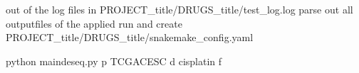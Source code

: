 \documentclass[letterpaper,10pt,english]{sphinxmanual}
\begin{document}
\begin{fulllineitems}
\begin{quote}
\begin{description}
\end{description}\end{quote}

\sphinxAtStartPar
out of the log files in PROJECT\_title/DRUGS\_title/test\_log.log
parse out all outputfiles of the applied run and create
PROJECT\_title/DRUGS\_title/snakemake\_config.yaml

\begin{sphinxVerbatim}[commandchars=\\\{\}]
\PYGZdl{} python main\PYGZus{}deseq.py \PYGZhy{}p TCGA\PYGZhy{}CESC \PYGZhy{}d cisplatin \PYGZhy{}f 
\end{sphinxVerbatim}

\end{fulllineitems}

\end{document}
